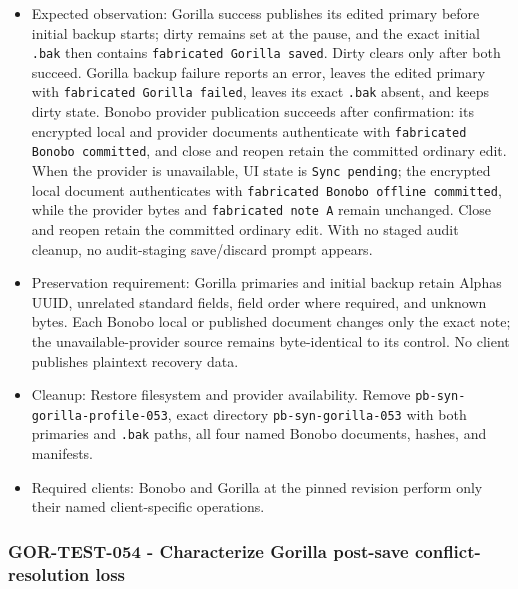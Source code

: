 \documentclass[
  letterpaper,
]{article}
\newcommand{\passthrough}[1]{#1}
\begin{document}
\begin{itemize}
  observe provider state, then close and reopen from the encrypted local document.
\item
  Expected observation: Gorilla success publishes its edited primary before initial backup starts; dirty remains set at
  the pause, and the exact initial \passthrough{\lstinline!.bak!} then contains
  \passthrough{\lstinline!fabricated Gorilla saved!}. Dirty clears only after both succeed. Gorilla backup failure
  reports an error, leaves the edited primary with \passthrough{\lstinline!fabricated Gorilla failed!}, leaves its exact
  \passthrough{\lstinline!.bak!} absent, and keeps dirty state. Bonobo provider publication succeeds after confirmation:
  its encrypted local and provider documents authenticate with \passthrough{\lstinline!fabricated Bonobo committed!},
  and close and reopen retain the committed ordinary edit. When the provider is unavailable, UI state is
  \passthrough{\lstinline!Sync pending!}; the encrypted local document authenticates with
  \passthrough{\lstinline!fabricated Bonobo offline committed!}, while the provider bytes and
  \passthrough{\lstinline!fabricated note A!} remain unchanged. Close and reopen retain the committed ordinary edit.
  With no staged audit cleanup, no audit-staging save/discard prompt appears.
\item
  Preservation requirement: Gorilla primaries and initial backup retain Alpha\textquotesingle s UUID, unrelated standard
  fields, field order where required, and unknown bytes. Each Bonobo local or published document changes only the exact
  note; the unavailable-provider source remains byte-identical to its control. No client publishes plaintext recovery
  data.
\item
  Cleanup: Restore filesystem and provider availability. Remove \nolinkurl{pb-syn-gorilla-profile-053}, exact directory
  \nolinkurl{pb-syn-gorilla-053} with both primaries and \passthrough{\lstinline!.bak!} paths, all four named Bonobo
  documents, hashes, and manifests.
\item
  Required clients: Bonobo and Gorilla at the pinned revision perform only their named client-specific operations.
\end{itemize}

\subsubsection{GOR-TEST-054 - Characterize Gorilla post-save conflict-resolution
loss}\label{gor-test-054---characterize-gorilla-post-save-conflict-resolution-loss}
\end{document}
